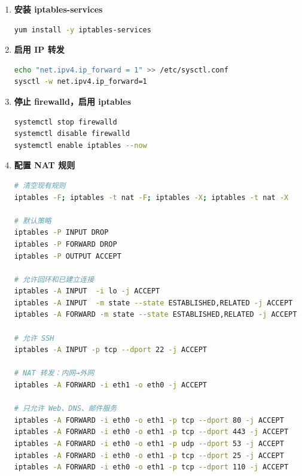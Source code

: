 \documentclass[12pt,a4paper]{ctexart}
\begin{document}
\begin{enumerate}[label=\arabic*.,leftmargin=*]

  \item \textbf{安装 iptables-services}

  \begin{cmdbox}
  \begin{lstlisting}[language=bash]
yum install -y iptables-services
  \end{lstlisting}
  \end{cmdbox}

  \item \textbf{启用 IP 转发}

  \begin{cmdbox}
  \begin{lstlisting}[language=bash]
echo "net.ipv4.ip_forward = 1" >> /etc/sysctl.conf
sysctl -w net.ipv4.ip_forward=1
  \end{lstlisting}
  \end{cmdbox}

  \item \textbf{停止 firewalld，启用 iptables}

  \begin{cmdbox}
  \begin{lstlisting}[language=bash]
systemctl stop firewalld
systemctl disable firewalld
systemctl enable iptables --now
  \end{lstlisting}
  \end{cmdbox}

  \item \textbf{配置 NAT 规则}

  \begin{cmdbox}
  \begin{lstlisting}[language=bash]
# 清空现有规则
iptables -F; iptables -t nat -F; iptables -X; iptables -t nat -X

# 默认策略
iptables -P INPUT DROP
iptables -P FORWARD DROP
iptables -P OUTPUT ACCEPT

# 允许回环和已建立连接
iptables -A INPUT  -i lo -j ACCEPT
iptables -A INPUT  -m state --state ESTABLISHED,RELATED -j ACCEPT
iptables -A FORWARD -m state --state ESTABLISHED,RELATED -j ACCEPT

# 允许 SSH
iptables -A INPUT -p tcp --dport 22 -j ACCEPT

# NAT 转发：内网→外网
iptables -A FORWARD -i eth1 -o eth0 -j ACCEPT

# 只允许 Web、DNS、邮件服务
iptables -A FORWARD -i eth0 -o eth1 -p tcp --dport 80 -j ACCEPT
iptables -A FORWARD -i eth0 -o eth1 -p tcp --dport 443 -j ACCEPT
iptables -A FORWARD -i eth0 -o eth1 -p udp --dport 53 -j ACCEPT
iptables -A FORWARD -i eth0 -o eth1 -p tcp --dport 25 -j ACCEPT
iptables -A FORWARD -i eth0 -o eth1 -p tcp --dport 110 -j ACCEPT


\end{lstlisting}
\end{cmdbox}
\end{enumerate}
\end{document}
